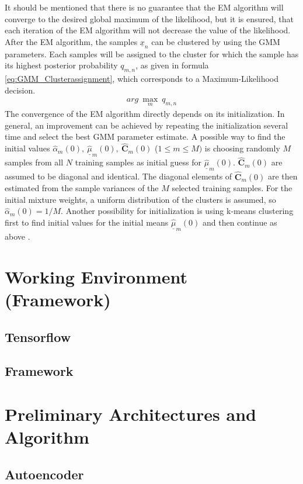 \documentclass[12pt,DIV14,BCOR12mm,a4paper,footexclude,headinclude,halfparskip-,twoside,openright,openany,cleardoubleempty,idxtotoc,bibtotoc]{scrreprt} %
\numberwithin{equation}{chapter}
\begin{document}
It should be mentioned that there is no guarantee that the EM algorithm will converge to the desired global maximum of the likelihood, but it is ensured, that each iteration of the EM algorithm will not decrease the value of the likelihood.\\
After the EM algorithm, the samples $\underline{x}_n$ can be clustered by using the GMM parameters. Each samples will be assigned to the cluster for which the sample has its highest posterior probability $q_{m,n}$, as given in formula \ref{eq:GMM_Clusterassignment}, which corresponds to a Maximum-Likelihood decision.
\begin{align}
	arg\ \underset{m}\max\ q_{m,n}\label{eq:GMM_Clusterassignment}
\end{align}
The convergence of the EM algorithm directly depends on its initialization. In general, an improvement can be achieved by repeating the initialization several time and select the best GMM parameter estimate. A possible way to find the initial values $\hat{\alpha}_m(0),\ \hat{\underline{\mu}}_m(0),\ \hat{\mathbf{C}}_m(0)$ ($1 \leq m \leq M)$ is choosing randomly $M$ samples from all $N$ training samples as initial guess for $\hat{\underline{\mu}}_m(0)$. $\hat{\mathbf{C}}_m(0)$ are assumed to be diagonal and identical. The diagonal elements of $\hat{\mathbf{C}}_m(0)$ are then estimated from the sample variances of the $M$ selected training samples. For the initial mixture weights, a uniform distribution of the clusters is assumed, so $\hat{\alpha}_m(0) = 1/M$. Another possibility for initialization is using k-means clustering first to find initial values for the initial means $\hat{\underline{\mu}}_m(0)$ and then continue as above \cite{LectureNotes_DPR}.
\chapter{Working Environment (Framework)}
\section{Tensorflow}
\section{Framework}
\chapter{Preliminary Architectures and Algorithm}
\section{Autoencoder}
\end{document}
